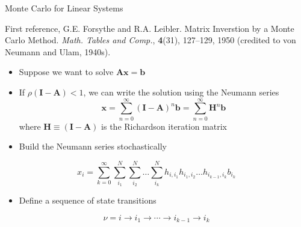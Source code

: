 \documentclass{beamer}
\begin{document}
\begin{frame}{Monte Carlo for Linear Systems}
  
  First reference, G.E. Forsythe and R.A. Leibler. Matrix Inverstion by a
  Monte Carlo Method. \textit{Math. Tables and Comp.}, {\bf 4}(31), 127--129,
  1950 (credited to von Neumann and Ulam, 1940s).
  \vfill
  \begin{itemize}
    \item Suppose we want to solve $\mathbf{Ax}=\mathbf{b}$
    \vfill
    \item If $\rho(\mathbf{I-A})<1$, we can write the solution using the
      Neumann series
      \begin{equation*}
        \mathbf{x} = \sum_{n=0}^{\infty} (\mathbf{I-A})^n \mathbf{b}
         = \sum_{n=0}^{\infty} \mathbf{H}^n \mathbf{b}
      \end{equation*}
      where $\mathbf{H} \equiv ( \mathbf{I-A} )$ is the Richardson
      iteration matrix
      \vfill
    \item Build the Neumann series stochastically
  \end{itemize}

  \[
  x_i = \sum_{k=0}^{\infty}\sum_{i_1}^{N}\sum_{i_2}^{N}\ldots
  \sum_{i_k}^{N}h_{i,i_1}h_{i_1,i_2}\ldots h_{i_{k-1},i_k}b_{i_k}
  \]

  \begin{itemize}
  \item Define a sequence of state transitions
  \end{itemize}
  \[
  \nu = i \rightarrow i_1 \rightarrow \cdots \rightarrow i_{k-1}
  \rightarrow i_{k}
  \]

\end{frame}

\end{document}
